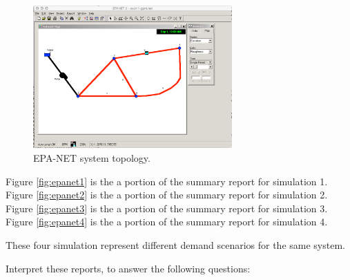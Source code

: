 \documentclass[11pt]{article}
\begin{document}
\begin{enumerate}
\begin{figure}[h!] %
\centering
   \includegraphics[width=3in]{epa-net-map-gpm.jpg}
   \caption{EPA-NET system topology.}
   \label{fig:epa-net-map-gpm} 
\end{figure}

Figure \ref{fig:epanet1} is the a portion of the summary report for simulation 1.   
Figure \ref{fig:epanet2} is the a portion of the summary report for simulation 2.  
Figure \ref{fig:epanet3} is the a portion of the summary report for simulation 3.  
Figure \ref{fig:epanet4} is the a portion of the summary report for simulation 4.

These four simulation represent different demand scenarios for the same system.



Interpret these reports, to answer the following questions:


\end{enumerate}
\end{document}
